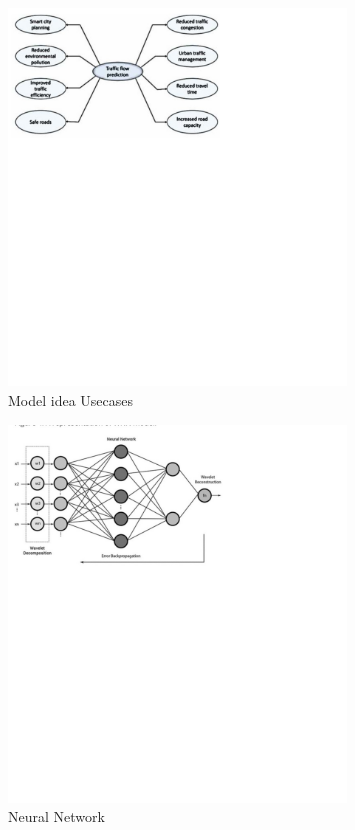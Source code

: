 \documentclass{IEEEtran}
\begin{document}
\begin{figure}[h]
    \centering
    \includegraphics[width=0.8\textwidth]{displ.jpg}
    
    \caption{Model idea Usecases}
    \label{fig:Use cases}
\end{figure}
\begin{figure}[h]
    \centering
    \includegraphics[width=0.8\textwidth]{displ2.jpg}
    
    \caption{Neural Network}
    \label{fig:Neural Network}
\end{figure}
\end{document}
